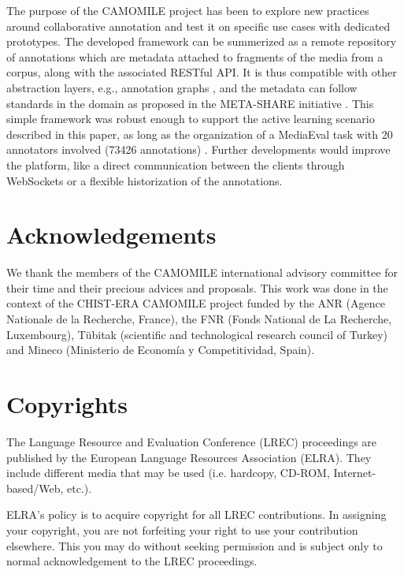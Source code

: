 \documentclass[10pt, a4paper]{article}
\begin{document}
The purpose of the CAMOMILE project has been to explore new practices around collaborative annotation and test it on specific use cases with dedicated prototypes. The developed framework can be summerized as a remote repository of annotations which are metadata attached to fragments of the media from a corpus, along with the associated RESTful API. It is thus compatible with other abstraction layers, e.g., annotation graphs \cite{Bird2001}, and the metadata can follow standards in the domain as proposed in the META-SHARE initiative \cite{META-SHARE}. This simple framework was robust enough to support the active learning scenario described in this paper, as long as the organization of a MediaEval task with 20 annotators involved (73426 annotations) \cite{Poignant2016} . Further developments would improve the platform, like a direct communication between the clients through WebSockets or a flexible historization of the annotations.


\section{Acknowledgements}

We thank the members of the CAMOMILE international advisory committee for their time and their precious advices and proposals. This work was done in the context of the CHIST-ERA CAMOMILE project funded by the ANR (Agence Nationale de la Recherche, France), the FNR (Fonds National de La Recherche, Luxembourg), Tübitak (scientific and technological research council of Turkey) and Mineco (Ministerio de Economía y Competitividad, Spain).


\section{Copyrights}

The Lan\-gua\-ge Re\-sour\-ce and Evalua\-tion Con\-fe\-rence (LREC) proceedings are published by the European Language Resources Association (ELRA). They include different media that may be used (i.e. hardcopy, CD-ROM, Internet-based/Web, etc.).

ELRA's policy is to acquire copyright for all LREC contributions. In assigning your copyright, you are not forfeiting your right to use your contribution elsewhere.  This you may do without seeking permission and is subject only to normal acknowledgement to the LREC proceedings.




\end{document}
